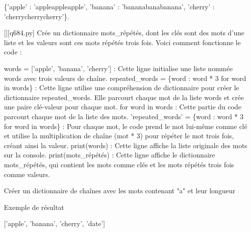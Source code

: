 \{'apple' : 'appleappleapple', 'banana' : 'bananabanabanana', 'cherry' : 'cherrycherrycherry'\}.
        \par
        \begin{solution}
            \renewcommand{\nomfichier}{q684.py}
            \pythonfile{\chemincode \nomfichier}[][\nomfichier]
            Crée un dictionnaire mots\_répétés, dont les clés sont des mots d'une liste et les valeurs sont ces mots répétés trois fois. Voici comment fonctionne le code :

    words = ['apple', 'banana', 'cherry'] : Cette ligne initialise une liste nommée words avec trois valeurs de chaîne.
    repeated\_words = \{word : word * 3 for word in words\} : Cette ligne utilise une compréhension de dictionnaire pour créer le dictionnaire repeated\_words. Elle parcourt chaque mot de la liste words et crée une paire clé-valeur pour chaque mot.
        for word in words : Cette partie du code parcourt chaque mot de la liste des mots.
        'repeated\_words' = \{word : word * 3 for word in words\} : Pour chaque mot, le code prend le mot lui-même comme clé et utilise la multiplication de chaîne (mot * 3) pour répéter le mot trois fois, créant ainsi la valeur.
    print(words) : Cette ligne affiche la liste originale des mots sur la console.
    print(mots\_répétés) : Cette ligne affiche le dictionnaire mots\_répétés, qui contient les mots comme clés et les mots répétés trois fois comme valeurs.
        \end{solution}
        

        \question
        Créer un dictionnaire de chaînes avec les mots contenant "a" et leur longueur

Exemple de résultat

['apple', 'banana', 'cherry', 'date']

